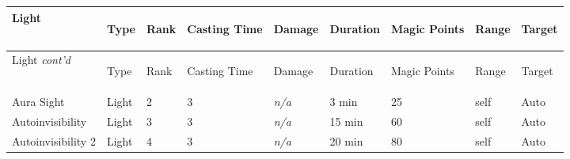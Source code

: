 \documentclass[twoside]{book}
\begin{document}
\begin{longtable}{p{1.25in}lp{2em}p{1.5em}lllll} 
  Light& \begin{turn}{70}{Type}\end{turn}
          & \begin{turn}{70}{Rank}\end{turn}
          & \begin{turn}{70}{Casting Time}\end{turn}
          & \begin{turn}{70}{Damage}\end{turn}
          & \begin{turn}{70}{Duration}\end{turn}
          & \begin{turn}{70}{Magic Points}\end{turn}
          & \begin{turn}{70}{Range}\end{turn}
          & \begin{turn}{70}{Target}\end{turn}
          \\
  \hline
  \hline
  \endfirsthead
  Light \textit{cont'd}
        & \begin{turn}{70}{Type}\end{turn}
          & \begin{turn}{70}{Rank}\end{turn}
          & \begin{turn}{70}{Casting Time}\end{turn}
          & \begin{turn}{70}{Damage}\end{turn}
          & \begin{turn}{70}{Duration}\end{turn}
          & \begin{turn}{70}{Magic Points}\end{turn}
          & \begin{turn}{70}{Range}\end{turn}
          & \begin{turn}{70}{Target}\end{turn}
           \\
  \hline
  \endhead
\raggedright  Aura Sight& Light& 2& 3&\textit{n/a}& 3 min& 25& self& Auto\tabularnewline
      \raggedright  Autoinvisibility& Light& 3& 3&\textit{n/a}& 15 min& 60& self& Auto\tabularnewline
      \raggedright  Autoinvisibility 2& Light& 4& 3&\textit{n/a}& 20 min& 80& self& Auto\tabularnewline

\end{longtable}
\end{document}
